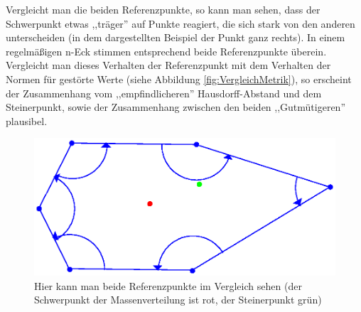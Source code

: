 Vergleicht man die beiden Referenzpunkte, so kann man sehen, dass der Schwerpunkt etwas ,,träger'' auf Punkte reagiert, die sich stark von den anderen unterscheiden (in dem dargestellten Beispiel der Punkt ganz rechts). In einem regelmäßigen n-Eck stimmen entsprechend beide Referenzpunkte überein. Vergleicht man dieses Verhalten der Referenzpunkt mit dem Verhalten der Normen für gestörte Werte (siehe Abbildung \ref{fig:VergleichMetrik}), so erscheint der Zusammenhang vom ,,empfindlicheren'' Hausdorff-Abstand und dem  Steinerpunkt, sowie der Zusammenhang zwischen den beiden ,,Gutmütigeren'' plausibel.

\begin{figure}
	\centering
	\includegraphics[scale=.8]{Referenzpunkte.eps}
	\caption[Vergleich beider Referenzpunkte]{Hier kann man beide Referenzpunkte im Vergleich sehen (der Schwerpunkt der Massenverteilung ist rot, der Steinerpunkt grün) }
	\label{fig:Referenzpunkte}
\end{figure}



